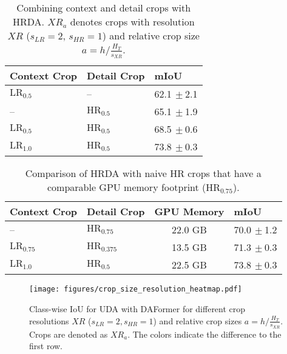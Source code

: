 \documentclass[journal,compsoc]{IEEEtran}
\newcommand{\spm}[1]{\tiny{$\,\pm$#1}}
\begin{document}
\begin{table}
\centering
\caption{
Combining context and detail crops with HRDA. $\mathit{XR}_a$ denotes crops with resolution $\mathit{
XR}$ ($s_\mathit{LR}{=}2$, $s_\mathit{HR}{=}1$) and relative crop size $a{=}h / \frac{H_T}{s_\mathit{XR}}$.
}
\label{tab:context_crop_size}
\setlength{\tabcolsep}{5pt}
\footnotesize
\begin{tabular}{lll}
\toprule
Context Crop & Detail Crop &           mIoU \\
\midrule
$\text{LR}_{0.5}$ &       -- & 62.1\spm{2.1} \\
-- &   $\text{HR}_{0.5}$ & 65.1\spm{1.9} \\
$\text{LR}_{0.5}$ &   $\text{HR}_{0.5}$ & 68.5\spm{0.6} \\
$\text{LR}_{1.0}$ &   $\text{HR}_{0.5}$ & 73.8\spm{0.3} \\
\bottomrule
\end{tabular}
\end{table}



\begin{table}
\centering
\caption{Comparison of HRDA with naive HR crops that have a comparable GPU memory footprint ($\text{HR}_{0.75}$).}
\label{tab:baselines}
\setlength{\tabcolsep}{3pt}
\footnotesize
\begin{tabular}{llcl}
\toprule
Context Crop & Detail Crop & GPU Memory &            mIoU \\
\midrule
          -- &     $\text{HR}_{0.75}$ &  22.0 GB &  70.0\spm{1.2} \\
     $\text{LR}_{0.75}$ &    $\text{HR}_{0.375}$ &  13.5 GB &  71.3\spm{0.3} \\
      $\text{LR}_{1.0}$ &      $\text{HR}_{0.5}$ &  22.5 GB &  73.8\spm{0.3} \\
\bottomrule
\end{tabular}
\end{table}


 
\begin{figure}[tb]
\centering
\texttt{[image: figures/crop\_size\_resolution\_heatmap.pdf]}
\caption{
Class-wise IoU for UDA with DAFormer for different crop resolutions $\mathit{XR}$ ($s_\mathit{LR}{=}2, s_\mathit{HR}{=}1$) and relative crop sizes $a{=}h / \frac{H_T}{s_\mathit{XR}}$. Crops are denoted as $\mathit{XR}_a$. The colors indicate the difference to the first row.
}
\label{fig:crop_resolution_heatmap}
\end{figure}
\end{document}
